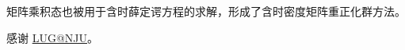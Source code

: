 \documentclass[
    ]{njuthesis}
\begin{document}
矩阵乘积态也被用于含时薛定谔方程的求解，形成了含时密度矩阵重正化群方法\cite{schollwock2011}。


\printbibliography


\begin{acknowledgement}
    感谢 \href{https://git.nju.edu.cn/nju-lug/lug-introduction}{LUG@NJU}。
\end{acknowledgement}


\appendix


\end{document}
